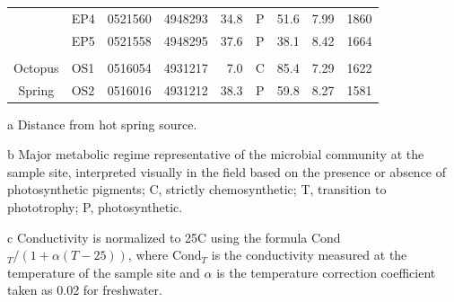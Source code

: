 \begin{table}[htbp]
\begin{adjustbox}{width=\textwidth,keepaspectratio}
\begin{threeparttable}
\begin{tabular}{clccrcccc}
      & EP4   & 0521560 & 4948293 & 34.8  & P     & 51.6  & 7.99  & 1860 \\
      & EP5   & 0521558 & 4948295 & 37.6  & P     & 38.1  & 8.42  & 1664 \\
      &       &       &       &       &       &       &       &  \\
Octopus & OS1   & 0516054 & 4931217 & 7.0   & C     & 85.4  & 7.29  & 1622 \\
Spring & OS2   & 0516016 & 4931212 & 38.3  & P     & 59.8  & 8.27  & 1581 \\
\bottomrule
\end{tabular}%

    \begin{tablenotes}
      \small
      \item[a] Distance from hot spring source.
      \item[b] Major metabolic regime representative of the microbial community at the sample site, interpreted visually in the field based on the presence or absence of photosynthetic pigments; C, strictly chemosynthetic; T, transition to phototrophy; P, photosynthetic.
      \item[c] Conductivity is normalized to 25\degree C using the formula Cond$_{T}/(1+\alpha(T-25))$, where Cond$_{T}$ is the conductivity measured at the temperature of the sample site and $\alpha$ is the temperature correction coefficient taken as 0.02 for freshwater.
    \end{tablenotes}
  \label{tab:geophysical}%
  \end{threeparttable}
  \end{adjustbox}
\end{table}%
\doublespace



